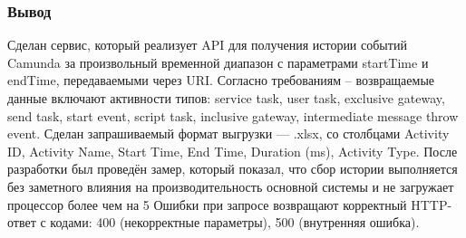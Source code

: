 \subsubsection{Вывод}

Сделан сервис, который реализует API для получения истории событий Camunda за произвольный временной диапазон с параметрами startTime и endTime, передаваемыми через URI. Согласно требованиям -- возвращаемые данные включают активности типов: service task, user task, exclusive gateway, send task, start event, script task, inclusive gateway, intermediate message throw event.
Сделан запрашиваемый формат выгрузки — .xlsx, со столбцами Activity ID, Activity Name, Start Time, End Time, Duration (ms), Activity Type.
После разработки был проведён замер, который показал, что сбор истории выполняется без заметного влияния на производительность основной системы и не загружает процессор более чем на 5%
Ошибки при запросе возвращают корректный HTTP-ответ с кодами: 400 (некорректные параметры), 500 (внутренняя ошибка).
















